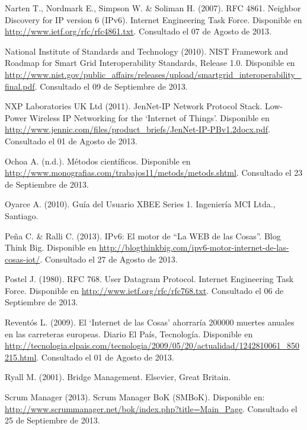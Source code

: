 \begin{spacing}{1.0}
\begin{thebibliography}{99}
Narten T., Nordmark E., Simpson W. \& Soliman H. (2007).
\newblock RFC 4861. Neighbor Discovery for IP version 6 (IPv6). Internet Engineering Task Force.
\newblock Disponible en \url{http://www.ietf.org/rfc/rfc4861.txt}.
\newblock Consultado el 07 de Agosto de 2013.

National Institute of Standards and Technology (2010).
\newblock NIST Framework and Roadmap for Smart Grid Interoperability Standards, Release 1.0.
\newblock Disponible en \url{http://www.nist.gov/public_affairs/releases/upload/smartgrid_interoperability_final.pdf}.
\newblock Consultado el 09 de Septiembre de 2013.

NXP Laboratories UK  Ltd  (2011). 
\newblock JenNet-IP Network Protocol Stack. Low-Power Wireless IP Networking for the `Internet of Things'.
\newblock Disponible en \url{http://www.jennic.com/files/product_briefs/JenNet-IP-PBv1.2docx.pdf}.
\newblock Consultado el 01 de Agosto de 2013.

Ochoa A. (n.d.).
\newblock Métodos científicos.
\newblock Disponible en \url{http://www.monografias.com/trabajos11/metods/metods.shtml}.
\newblock Consultado el 23 de Septiembre de 2013.

Oyarce A. (2010).
\newblock Guía del Usuario XBEE Series 1.
\newblock Ingeniería MCI Ltda., Santiago.

Peña C. \& Ralli C. (2013).
\newblock IPv6: El motor de ``La WEB de las Cosas''. Blog Think Big.
\newblock Disponible en \url{http://blogthinkbig.com/ipv6-motor-internet-de-las-cosas-iot/}.
\newblock Consultado el 27 de Agosto de 2013.

Postel J. (1980).
\newblock RFC 768. User Datagram Protocol. Internet Engineering Task Force.
\newblock Disponible en \url{http://www.ietf.org/rfc/rfc768.txt}.
\newblock Consultado el 06 de Septiembre de 2013.

Reventós  L. (2009).
\newblock El `Internet de las Cosas' ahorraría 200000 muertes anuales en las carreteras europeas. Diario El País, Tecnología.
\newblock Disponible en \url{http://tecnologia.elpais.com/tecnologia/2009/05/20/actualidad/1242810061_850215.html}.
\newblock Consultado el 01 de Agosto de 2013.

Ryall M. (2001).
\newblock Bridge Management.
\newblock Elsevier, Great Britain.

Scrum Manager (2013).
\newblock Scrum Manager BoK (SMBoK).
\newblock Disponible en: \url{http://www.scrummanager.net/bok/index.php?title=Main_Page}.
\newblock Consultado el 25 de Septiembre de 2013.


\end{thebibliography}
\end{spacing}
